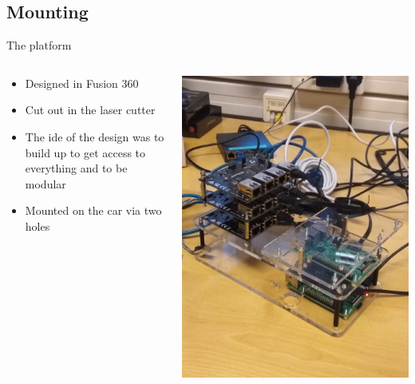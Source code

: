 \documentclass{beamer}
\begin{document}
\subsection{Mounting}
\begin{frame}{The platform}
    
    \begin{columns}
        \begin{column}{0.47\textwidth}
            \begin{itemize}
                \item  Designed in Fusion 360
                \item  Cut out in the laser cutter
                \item  The ide of the design was to build up to get access to everything and to be modular
                \item Mounted on the car via two holes 
            \end{itemize}
        \end{column}
        \begin{column}{0.5\textwidth}
            \includegraphics[width=0.7\linewidth]{platform.jpg}
            \label{fig:platform}
        \end{column}
    \end{columns}
\end{frame}
\end{document}
